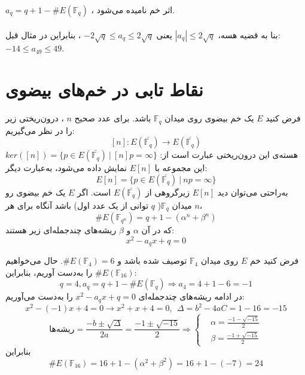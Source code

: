 \label{ss}
$a_q=q+1- \# E(\mathbb{F}_q)$
، اثر خم نامیده می‌شود.
\\
\\
بنا به قضیه‌ هسه،
$|a_q| \leq 2\sqrt{q}$
یعنی
$ -2\sqrt{q} \leq a_q \leq 2\sqrt{q}$
، بنابراین در مثال قبل:
\\
$-14 \leq a_{49} \leq 49$.
\section{نقاط تابی در خم‌های بیضوی}

فرض کنید
$E$
یک خم بیضوی روی میدان
$\mathbb{F}_q$
باشد. برای عدد صحیح 
$n$
، درون‌ریختی زیر را در نظر می‌گیریم:
$$ [n]: E(\bar{\mathbb{F}_q}) \longrightarrow E(\bar{\mathbb{F}_q}) $$
هسته‌ی این درون‌ریختی عبارت است از:
$ker([n]) = \{ p \in E(\bar{\mathbb{F}_q}) ~|~ [n]p=\infty \}$
این مجموعه با 
$E[n]$
نمایش داده می‌شود، به‌عبارت دیگر:
$$ E[n] = \{ p \in E(\bar{\mathbb{F}_q}) ~|~ np=\infty \} $$
به‌راحتی می‌توان دید
$E[n]$
زیرگروهی از 
$E(\bar{\mathbb{F}_q})$
است.
\theorem 
اگر
$E$
یک خم بیضوی رو میدان
$\mathbb{F}_q$(
$q$
توانی از یک عدد اول) باشد آنگاه برای هر
$n$، 
$$ \# E({\mathbb{F}}_{q^n}) = q+1-({\alpha}^n +{\beta}^n) $$
که در آن
$\alpha$
و
$\beta$
ریشه‌های چندجمله‌ای زیر هستند:
$$x^2-a_qx+q=0$$

\example
فرض کنید خم
$E$
روی میدان
$\mathbb{F}_4$
توصیف شده باشد و 
$\# E(\mathbb{F}_4) = 6$.
حال می‌خواهیم
$\# E(\mathbb{F}_{16})$
را به‌دست آوریم، بنابراین:
$$q=4, a_q=q+1- \# E(\mathbb{F}_q) \Longrightarrow a_4=4+1-6=-1$$
در ادامه ریشه‌های چندجمله‌ای 
$x^2-a_qx+q=0$
را به‌دست می‌آوریم:
$$ x^2-(-1)x+4=0 \longrightarrow x^2+x+4=0, ~~ \Delta=b^2-4aC=1-16=-15 $$
\begin{equation*}
\text{ریشه‌ها}= \frac{-b \pm \sqrt{\Delta}}{2a} = \frac{-1 \pm \sqrt{-15}}{2} \Longrightarrow
\begin{cases}
& \alpha = \frac{-1- \sqrt{-15}}{2} \\
& \beta = \frac{-1+ \sqrt{-15}}{2} 
\end{cases}
\end{equation*}
بنابراین
$$ \# E(\mathbb{F}_{16}) = 16+1 -({\alpha}^2 + {\beta}^2) = 16+1-(-7)=24 $$

